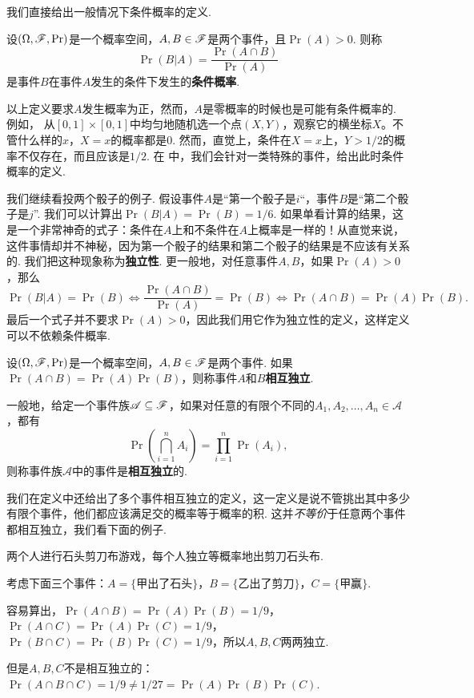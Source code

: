 我们直接给出一般情况下条件概率的定义. 

\begin{definition}[条件概率]
设$(\Omega,\mathscr{F},\Pr)$是一个概率空间，$A,B\in\mathscr{F}$是两个事件，且$\Pr(A)>0$. 则称
\[
    \Pr(B|A) = \frac{\Pr(A\cap B)}{\Pr(A)}
\]
是事件$B$在事件$A$发生的条件下发生的\textbf{条件概率}. 
\end{definition}

以上定义要求$A$发生概率为正，然而，$A$是零概率的时候也是可能有条件概率的. 例如，
从$[0,1]\times[0,1]$中均匀地随机选一个点$(X,Y)$，观察它的横坐标$X$。不管什么样的$x$，$X=x$的概率都是$0$. 然而，直觉上，条件在$X=x$上，$Y>1/2$的概率不仅存在，而且应该是$1/2$. 在 中，我们会针对一类特殊的事件，给出此时条件概率的定义. 

我们继续看投两个骰子的例子. 假设事件$A$是“第一个骰子是$i$“，事件$B$是“第二个骰子是$j$”. 我们可以计算出$\Pr(B|A)=\Pr(B)=1/6$. 如果单看计算的结果，这是一个非常神奇的式子：条件在$A$上和不条件在$A$上概率是一样的！从直觉来说，这件事情却并不神秘，因为第一个骰子的结果和第二个骰子的结果是不应该有关系的. 我们把这种现象称为\textbf{独立性}. 更一般地，对任意事件$A,B$，如果$\Pr(A)>0$，那么
\[\Pr(B|A)=\Pr(B)\iff \frac{\Pr(A\cap B)}{\Pr(A)}=\Pr(B)\iff \Pr(A\cap B)=\Pr(A)\Pr(B).\]
最后一个式子并不要求$\Pr(A)>0$，因此我们用它作为独立性的定义，这样定义可以不依赖条件概率. 

\begin{definition}[独立性]
设$(\Omega,\mathscr{F},\Pr)$是一个概率空间，$A,B\in\mathscr{F}$是两个事件. 如果$\Pr(A\cap B)=\Pr(A)\Pr(B)$，则称事件$A$和$B$\textbf{相互独立}. 

一般地，给定一个事件族$\mathscr{A}\subseteq\mathscr{F}$，如果对任意的有限个不同的$A_1,A_2,\ldots,A_n\in\mathscr{A}$，都有
\[
    \Pr\left(\bigcap_{i=1}^n A_i\right) = \prod_{i=1}^n \Pr(A_i),
\]
则称事件族$\mathscr{A}$中的事件是\textbf{相互独立}的. 
\end{definition}

我们在定义中还给出了多个事件相互独立的定义，这一定义是说不管挑出其中多少有限个事件，他们都应该满足交的概率等于概率的积. 这并\emph{不等价}于任意两个事件都相互独立，我们看下面的例子. 

\begin{example}
两个人进行石头剪刀布游戏，每个人独立等概率地出剪刀石头布. 

考虑下面三个事件：$A=\{\text{甲出了石头}\}$，$B=\{\text{乙出了剪刀}\}$，$C=\{\text{甲赢}\}$.

容易算出，$\Pr(A\cap B)=\Pr(A)\Pr(B)=1/9$，$\Pr(A\cap C)=\Pr(A)\Pr(C)=1/9$，$\Pr(B\cap C)=\Pr(B)\Pr(C)=1/9$，所以$A,B,C$两两独立. 

但是$A,B,C$不是相互独立的：$\Pr(A\cap B\cap C)=1/9\neq 1/27=\Pr(A)\Pr(B)\Pr(C)$.
\end{example}

